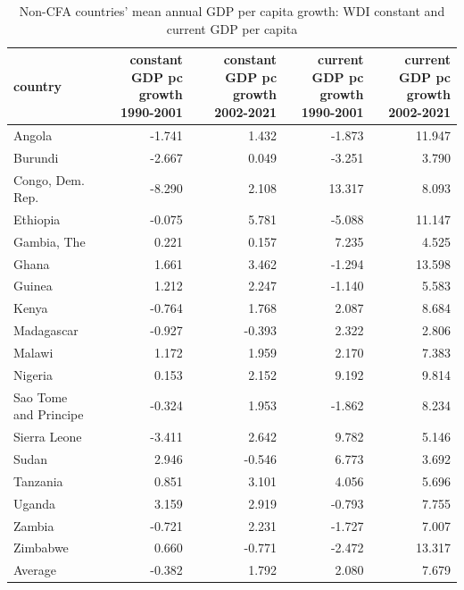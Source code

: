 \begin{table}

\caption{Non-CFA countries' mean annual GDP per capita growth: WDI constant and current GDP per capita}
\centering
\begin{tabular}[t]{lrrrr}
\toprule
country & constant GDP pc growth 1990-2001 & constant GDP pc growth 2002-2021 & current GDP pc growth 1990-2001 & current GDP pc growth 2002-2021\\
\midrule
Angola & -1.741 & 1.432 & -1.873 & 11.947\\
Burundi & -2.667 & 0.049 & -3.251 & 3.790\\
Congo, Dem. Rep. & -8.290 & 2.108 & 13.317 & 8.093\\
Ethiopia & -0.075 & 5.781 & -5.088 & 11.147\\
Gambia, The & 0.221 & 0.157 & 7.235 & 4.525\\
\addlinespace
Ghana & 1.661 & 3.462 & -1.294 & 13.598\\
Guinea & 1.212 & 2.247 & -1.140 & 5.583\\
Kenya & -0.764 & 1.768 & 2.087 & 8.684\\
Madagascar & -0.927 & -0.393 & 2.322 & 2.806\\
Malawi & 1.172 & 1.959 & 2.170 & 7.383\\
\addlinespace
Nigeria & 0.153 & 2.152 & 9.192 & 9.814\\
Sao Tome and Principe & -0.324 & 1.953 & -1.862 & 8.234\\
Sierra Leone & -3.411 & 2.642 & 9.782 & 5.146\\
Sudan & 2.946 & -0.546 & 6.773 & 3.692\\
Tanzania & 0.851 & 3.101 & 4.056 & 5.696\\
\addlinespace
Uganda & 3.159 & 2.919 & -0.793 & 7.755\\
Zambia & -0.721 & 2.231 & -1.727 & 7.007\\
Zimbabwe & 0.660 & -0.771 & -2.472 & 13.317\\
Average & -0.382 & 1.792 & 2.080 & 7.679\\
\bottomrule
\end{tabular}
\end{table}